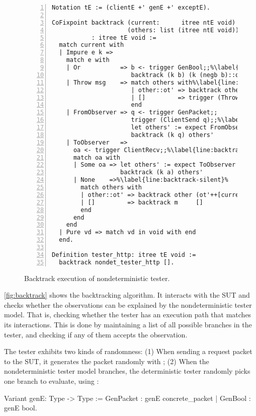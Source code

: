 \begin{figure}
\begin{lstlisting}[numbers=left]
Notation tE := (clientE +' genE +' exceptE).

CoFixpoint backtrack (current:      itree ntE void)
                     (others: list (itree ntE void))
           : itree tE void :=
  match current with
  | Impure e k =>
    match e with
    | Or           => b <- trigger GenBool;;%\label{line:backtrack-or}%
                      backtrack (k b) (k (negb b)::others)
    | Throw msg    => match others with%\label{line:backtrack-throw}%
                      | other::ot' => backtrack other ot'
                      | []         => trigger (Throw msg)
                      end
    | FromObserver => q <- trigger GenPacket;;
                      trigger (ClientSend q);;%\label{line:backtrack-send}%
                      let others' := expect FromObserver q others in
                      backtrack (k q) others'
    | ToObserver   =>
      oa <- trigger ClientRecv;;%\label{line:backtrack-recv}%
      match oa with
      | Some oa => let others' := expect ToObserver a others in
                   backtrack (k a) others'
      | None    =>%\label{line:backtrack-silent}%
        match others with
        | other::ot' => backtrack other (ot'++[current]) (* postpone *)%\label{line:backtrack-postpone}%
        | []         => backtrack m     []               (* retry    *)
        end
      end
    end
  | Pure vd => match vd in void with end
  end.

Definition tester_http: itree tE void :=
  backtrack nondet_tester_http [].
\end{lstlisting}
\caption{Backtrack execution of nondeterministic tester.}
\label{fig:backtrack}
\end{figure}

\autoref{fig:backtrack} shows the backtracking algorithm.  It interacts with the
SUT and checks whether the observations can be explained by the nondeterministic
tester model.  That is, checking whether the tester has an execution path that
matches its interactions.  This is done by maintaining a list of all possible
branches in the tester, and checking if any of them accepts the observation.

The tester exhibits two kinds of randomness: (1) When sending a request packet
to the SUT, it generates the packet randomly with ; (2) When the
nondeterministic tester model branches, the deterministic tester randomly picks
one branch to evaluate, using :
\begin{coq}
  Variant genE: Type -> Type :=
    GenPacket : genE concrete_packet
  | GenBool   : genE bool.
\end{coq}


